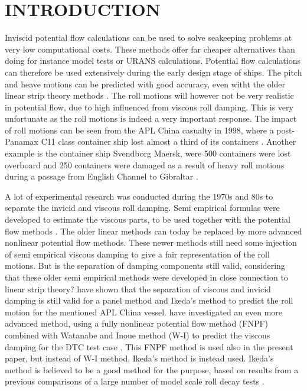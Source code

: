 \section*{INTRODUCTION}\label{introduction}

Inviscid potential flow calculations can be used to solve seakeeping
problems at very low computational costs. These methods offer far
cheaper alternatives than doing for instance model tests or URANS
calculations. Potential flow calculations can therefore be used
extensively during the early design stage of ships. The pitch and heave
motions can be predicted with good accuracy, even witht the older linear
strip theory methods \citep{7505983/FB64RGPF}. The roll motions will
however not be very realistic in potential flow, due to high influenced
from viscous roll damping. This is very unfortunate as the roll motions
is indeed a very important response. The impact of roll motions can be
seen from the APL China casualty in 1998, where a post-Panamax C11 class
container ship lost almost a third of its containers
\citep{7505983/WPADAQB3}. Another example is the container ship Svendborg
Maersk, were 500 containers were lost overboard and 250 containers were
damaged as a result of heavy roll motions during a passage from English
Channel to Gibraltar \citep{7505983/T78CMTDR}.

\quad A lot of experimental research was conducted during the 1970s and
80s to separate the invicid and viscous roll damping. Semi empirical
formulas were developed to estimate the viscous parts, to be used
together with the potential flow methods \citep{7505983/937PN5DT}. The
older linear methods can today be replaced by more advanced nonlinear
potential flow methods. These newer methods still need some injection of
semi empirical viscous damping to give a fair representation of the roll
motions. But is the separation of damping components still valid,
considering that these older semi empirical methods were developed in
close connection to linear strip theory? \citep{7505983/UGK6YEVD} have
shown that the separation of viscous and invicid damping is still valid
for a panel method and Ikeda's method to predict the roll motion for the
mentioned APL China vessel. \citep{7505983/24TNAV5Z} have investigated an
even more advanced method, using a fully nonlinear potential flow method
(FNPF) \citep{7505983/P4XDUMMQ} combined with Watanabe and Inoue method
(W-I) \citep{7505983/ARMIRMVY} to predict the viscous damping for the DTC
test case \citep{7505983/BYNJ8CFG}. This FNPF method is used also in the
present paper, but instead of W-I method, Ikeda's method is instead
used. Ikeda's method is believed to be a good method for the purpose,
based on results from a previous comparisons of a large number of model
scale roll decay tests \citep{7505983/QMGQ76Q9}.

